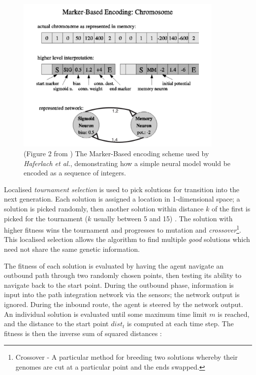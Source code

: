 \documentclass[a4paper,11pt,twoside,openright]{article}
\begin{document}
\begin{figure}[h!]
  \centering
  \includegraphics[width=0.9\textwidth]{MarkerBasedEncoding}
  \caption{\label{fig:markerbasedencoding} (Figure 2 from \cite{Haferlach2007})
    The Marker-Based encoding scheme used by \textit{Haferlach et al.},
    demonstrating how a simple neural model would be encoded as a sequence of
    integers.}
\end{figure}

Localised \textit{tournament selection} is used
to pick solutions for transition into the next generation. Each
solution is assigned a location in 1-dimensional space; a solution is
picked randomly, then another solution within distance $k$ of the
first is picked for the tournament ($k$ usually between 5 and 15)
\cite{Haferlach2007}. The solution with higher fitness wins the
tournament and progresses to mutation and
\textit{crossover}\footnote{Crossover - A particular method for
  breeding two solutions whereby their genomes are cut at a particular
  point and the ends swapped.}. This localised selection allows the
algorithm to find multiple \textit{good} solutions which need not
share the same genetic information.
\newline
\par

The fitness of each solution is evaluated by having the agent navigate
an outbound path through two randomly chosen points, then testing its
ability to navigate back to the start point. During the outbound
phase, information is input into the path integration network via the
sensors; the network output is ignored. During the inbound route, the
agent is steered by the network output.  An individual solution is
evaluated until some maximum time limit $m$ is reached, and the
distance to the start point $dist_t$ is computed at each time step. The
fitness is then the inverse sum of squared distances
\cite{Haferlach2007}:
\end{document}
